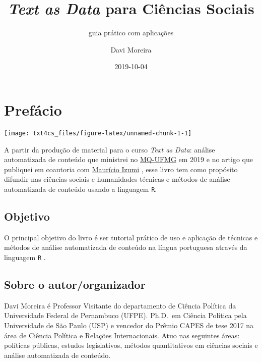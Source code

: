 \documentclass[]{book}
\title{\emph{Text as Data} para Ciências Sociais}
\subtitle{guia prático com aplicações}
\author{Davi Moreira}
\date{2019-10-04}
\begin{document}
\maketitle

{
\hypersetup{linkcolor=black}
\setcounter{tocdepth}{1}
\tableofcontents
}
\hypertarget{prefuxe1cio}{%
\chapter*{Prefácio}\label{prefuxe1cio}}

\begin{center}\texttt{[image: txt4cs\_files/figure-latex/unnamed-chunk-1-1]} \end{center}

A partir da produção de material para o curso \emph{Text as Data}: análise automatizada de conteúdo que ministrei no \href{http://www.fafich.ufmg.br/~mq/}{MQ-UFMG} em 2019 e no artigo que publiquei em coautoria com \href{http://lattes.cnpq.br/2546701843557096}{Maurício Izumi} \citep{izumi_o_2018}, esse livro tem como propósito difundir nas ciências sociais e humanidades técnicas e métodos de análise automatizada de conteúdo usando a linguagem \texttt{R}.

\hypertarget{objetivo}{%
\section*{Objetivo}\label{objetivo}}

O principal objetivo do livro é ser tutorial prático de uso e aplicação de técnicas e métodos de análise automatizada de conteúdo na língua portuguesa através da linguagem \texttt{R} .

\hypertarget{sobre-o-autororganizador}{%
\section*{Sobre o autor/organizador}\label{sobre-o-autororganizador}}

Davi Moreira é Professor Visitante do departamento de Ciência Política da Universidade Federal de Pernambuco (UFPE). Ph.D.~em Ciência Política pela Universidade de São Paulo (USP) e vencedor do Prêmio CAPES de tese 2017 na área de Ciência Política e Relações Internacionais. Atuo nas seguintes áreas: políticas públicas, estudos legislativos, métodos quantitativos em ciências sociais e análise automatizada de conteúdo.
\end{document}
